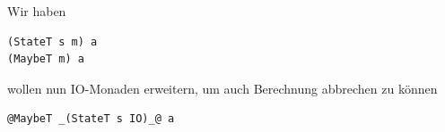 



	Wir haben

	\lstHaskell
	\begin{lstlisting}
(StateT s m) a
(MaybeT m) a
	\end{lstlisting}

	wollen nun IO-Monaden erweitern, um auch Berechnung abbrechen zu können

	\lstHaskell
	\begin{lstlisting}
@MaybeT _(StateT s IO)_@ a
	\end{lstlisting}